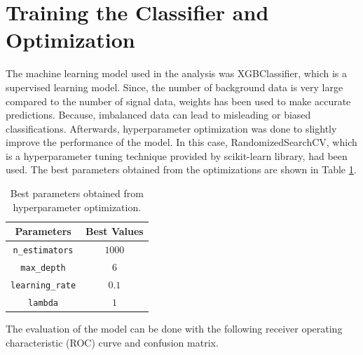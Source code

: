     \section{Training the Classifier and Optimization}
    The machine learning model used in the analysis was XGBClassifier, which is a supervised learning model. Since, the number of background data is very large compared to the number of signal data, weights has been used to make accurate predictions. Because, imbalanced data can lead to misleading or biased classifications. Afterwards, hyperparameter optimization was done to slightly improve the performance of the model. In this case, RandomizedSearchCV, which is a hyperparameter tuning technique provided by scikit-learn library, had been used. The best parameters obtained from the optimizations are shown in Table \ref{hyperparameter}.\\
    
\begin{table}[H]
        \centering
        \begin{tabular}{cc}
            \hline
            Parameters & Best Values\\
            \hline
             \texttt{n\_estimators} & $1000$ \\
             \texttt{max\_depth} & $6$ \\
             \texttt{learning\_rate} &  $0.1$ \\
             \texttt{lambda} & $1$ \\
             \hline
        \end{tabular}
        \caption{Best parameters obtained from hyperparameter optimization.}
        \label{hyperparameter}
    \end{table}
    
    The evaluation of the model can be done with the following receiver operating characteristic (ROC) curve and confusion matrix.\\

